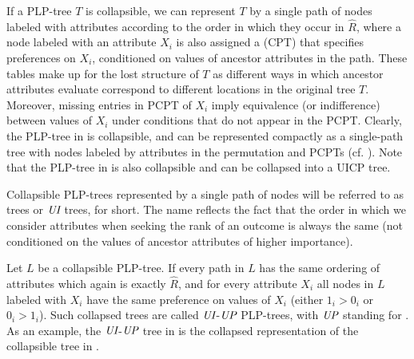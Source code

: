 If a PLP-tree $T$ is collapsible, we can represent $T$ by a single path
of nodes labeled with attributes according to the order in which they occur
in $\hat{R}$, 
where a node labeled with an attribute $X_i$ is also assigned a
 (CPT) that specifies 
preferences on $X_i$, conditioned on values of ancestor attributes in the path.
These tables make up for the lost structure of $T$ as different ways in 
which ancestor attributes evaluate correspond to different locations 
in the original tree $T$. 
Moreover, missing entries in PCPT of $X_i$ imply equivalence (or 
indifference) between values of $X_i$
under conditions that do not appear in the PCPT.
Clearly, the PLP-tree in  is collapsible, and can
be represented compactly as a single-path tree with nodes labeled by 
attributes in the permutation and PCPTs (cf. ).
Note that the PLP-tree in  is also collapsible and can be collapsed
into a UICP tree.

Collapsible PLP-trees represented by a single path of nodes 
will be referred to as  trees or $\textit{UI}$ 
trees, for short. The name reflects the fact that the order in which 
we consider attributes when seeking the rank of an outcome is always the 
same (not conditioned on the values of ancestor attributes of higher importance).

Let $L$ be a collapsible PLP-tree.
If every path in $L$ has the same ordering of attributes
which again is exactly $\hat{R}$, and
for every attribute $X_i$ all nodes in $L$ labeled with $X_i$ have the same
preference on values of $X_i$ (either $1_i>0_i$ or $0_i>1_i$).
Such collapsed 
trees are called $\textit{UI}$-$\textit{UP}$ PLP-trees, with $\textit{UP}$ standing for . As an example, the $\textit{UI}$-$\textit{UP}$ tree in 
is the collapsed representation of the collapsible tree in .

